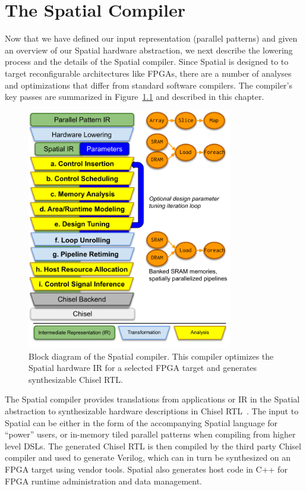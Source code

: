 \chapter{The Spatial Compiler}
\label{compiler}

Now that we have defined our input representation (parallel patterns) and given
an overview of our Spatial hardware abstraction, we next describe the lowering
process and the details of the Spatial compiler. Since Spatial is designed to
to target reconfigurable architectures like FPGAs, there are a
number of analyses and optimizations that differ from standard software compilers.
The compiler's key passes are summarized in Figure~\ref{fig:spatial-diag} and
described in this chapter.

\begin{figure}
\centering
\includegraphics[width=0.8\textwidth]{5-compiler/figs/spatial-diag}
\caption{\label{fig:spatial-diag}Block diagram of the Spatial compiler.
This compiler optimizes the Spatial hardware IR for a selected FPGA target
and generates synthesizable Chisel RTL.}
\end{figure}

The Spatial compiler provides translations from applications or IR
in the Spatial abstraction to synthesizable hardware descriptions in Chisel RTL~\cite{chisel}.
The input to Spatial can be either in the form of the accompanying Spatial language for ``power'' users,
or in-memory tiled parallel patterns when compiling from higher level DSLs.
The generated Chisel RTL is then compiled by the third party Chisel compiler and used
to generate Verilog, which can in turn be synthesized on an FPGA target using vendor tools.
Spatial also generates host code in C++ for FPGA runtime administration and data management.





